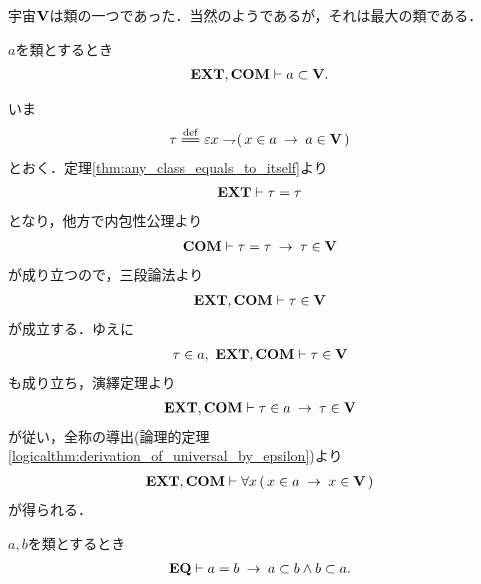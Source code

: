 	宇宙$\mathbf{V}$は類の一つであった．当然のようであるが，それは最大の類である．
	\begin{screen}
		\begin{thm}
			$a$を類とするとき
			\begin{align}
				\mbox{{\bf EXT}},\mbox{\bf COM} \vdash a \subset \mathbf{V}.
			\end{align}
		\end{thm}
	\end{screen}
	
	\begin{sketch}
		いま
		\begin{align}
			\tau \defeq \varepsilon x \negation (\, x \in a \rarrow a \in \Univ\, )
		\end{align}
		とおく．定理\ref{thm:any_class_equals_to_itself}より
		\begin{align}
			\mbox{{\bf EXT}} \vdash \tau = \tau
		\end{align}
		となり，他方で内包性公理より
		\begin{align}
			\mbox{\bf COM} \vdash \tau = \tau \hspace{0.25em}\rightarrow\hspace{0.25em} \tau \in \mathbf{V}
		\end{align}
		が成り立つので，三段論法より
		\begin{align}
			\mbox{{\bf EXT}},\mbox{\bf COM} \vdash \tau \in \mathbf{V}
		\end{align}
		が成立する．ゆえに
		\begin{align}
			\tau \in a,\ \mbox{{\bf EXT}},\mbox{\bf COM} \vdash \tau \in \mathbf{V}
		\end{align}
		も成り立ち，演繹定理より
		\begin{align}
			\mbox{{\bf EXT}},\mbox{\bf COM} \vdash \tau \in a \hspace{0.25em}\rightarrow\hspace{0.25em} \tau \in \mathbf{V}
		\end{align}
		が従い，全称の導出(論理的定理\ref{logicalthm:derivation_of_universal_by_epsilon})より
		\begin{align}
			\mbox{{\bf EXT}},\mbox{\bf COM} \vdash \forall x\, (\, x \in a \hspace{0.25em}\rightarrow\hspace{0.25em} x \in \mathbf{V}\, )
		\end{align}
		が得られる．
		\QED
	\end{sketch}
	
	\begin{screen}
		\begin{thm}[等しい類は相手を包含する]
		\label{thm:equivalent_classes_includes_the_other}
			$a,b$を類とするとき
			\begin{align}
				\mbox{{\bf EQ}} \vdash a = b \hspace{0.25em}\rightarrow\hspace{0.25em} a \subset b \wedge b \subset a.
			\end{align}
		\end{thm}
	\end{screen}
	
